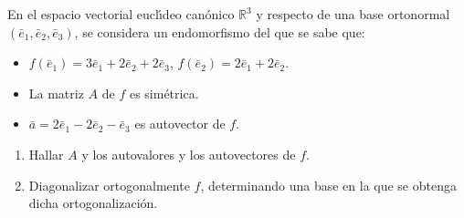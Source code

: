 \begin{enunciado}
 En el espacio vectorial eucl\'{\i}deo can\'onico $\mathbb{R}^3$ y respecto de una base ortonormal $(\bar{e}_1, \bar{e}_2, \bar{e}_3)$, se considera un endomorfismo del que se sabe que:
 \begin{itemize}
  \item $f(\bar{e}_1) = 3\bar{e}_1 + 2\bar{e}_2 + 2\bar{e}_3$, $f(\bar{e}_2) = 2\bar{e}_1 + 2\bar{e}_2$.
  
  \item La matriz $A$ de $f$ es sim\'etrica.
  
  \item $\bar{a} = 2\bar{e}_1 - 2\bar{e}_2 - \bar{e}_3$ es autovector de $f$.
 \end{itemize}
 \begin{enumerate}[$a$)]
  \item Hallar $A$ y los autovalores y los autovectores de $f$.
  
  \item Diagonalizar ortogonalmente $f$, determinando una base en la que se obtenga dicha ortogonalizaci\'on.
 \end{enumerate}
\end{enunciado}
 
